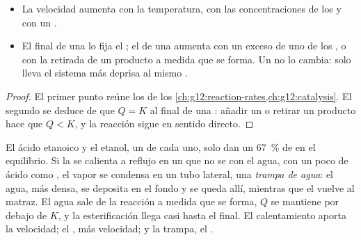 \begin{proposition}\label{prop:g12:synthesis-strategy:levers}
\begin{itemize}
  \item La velocidad aumenta con la temperatura, con las concentraciones
        de los  y con un .
  \item El  final de una  lo fija el ; el de una  aumenta con un exceso de
        uno de los , o con la retirada de un producto a medida
        que se forma. Un  no lo cambia: solo lleva el sistema
        más deprisa al mismo .
\end{itemize}
\end{proposition}

\begin{proof}
El primer punto reúne los  de los
\cref{ch:g12:reaction-rates,ch:g12:catalysis}. El segundo se deduce de
que $Q = K$ al final de una : añadir un  o
retirar un producto hace que $Q < K$, y la reacción sigue en sentido
directo.
\end{proof}

\begin{example}\label{ex:g12:synthesis-strategy:trap}
El ácido etanoico y el etanol, un  de cada uno, solo dan un
\qty{67}{\percent} de  en el equilibrio. Si la  se calienta a
reflujo en un  que no se  con el agua, con un poco de
ácido como , el vapor se condensa en un tubo lateral, una
\emph{trampa de agua}: el agua, más densa, se deposita en el fondo y se
queda allí, mientras que el  vuelve al matraz. El agua sale de
la reacción a medida que se forma, $Q$ se mantiene por debajo de $K$, y
la esterificación llega casi hasta el final. El calentamiento aporta la
velocidad; el , más velocidad; y la trampa, el .
\end{example}

